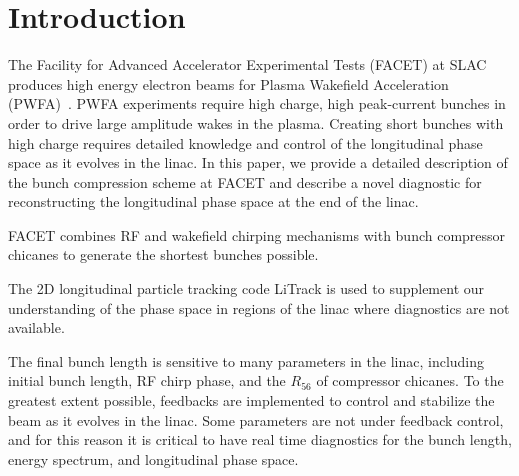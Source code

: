 \documentclass[%
twocolumn,
showpacs,preprintnumbers,
 aps,
prstab,
]{revtex4-1}
\begin{document}

\maketitle







\section{Introduction}
The Facility for Advanced Accelerator Experimental Tests (FACET) at SLAC produces high energy electron beams for Plasma Wakefield Acceleration (PWFA)~\cite{mjh_facet}. PWFA experiments require high charge, high peak-current bunches in order to drive large amplitude wakes in the plasma. Creating short bunches with high charge requires detailed knowledge and control of the longitudinal phase space as it evolves in the linac. In this paper, we provide a detailed description of the bunch compression scheme at FACET and describe a novel diagnostic for reconstructing the longitudinal phase space at the end of the linac.

FACET combines RF and wakefield chirping mechanisms with bunch compressor chicanes to generate the shortest bunches possible.

The 2D longitudinal particle tracking code LiTrack is used to supplement our understanding of the phase space in regions of the linac where diagnostics are not available.

The final bunch length is sensitive to many parameters in the linac, including initial bunch length, RF chirp phase, and the $R_{56}$ of compressor chicanes. To the greatest extent possible, feedbacks are implemented to control and stabilize the beam as it evolves in the linac. Some parameters are not under feedback control, and for this reason it is critical to have real time diagnostics for the bunch length, energy spectrum, and longitudinal phase space.
\end{document}
